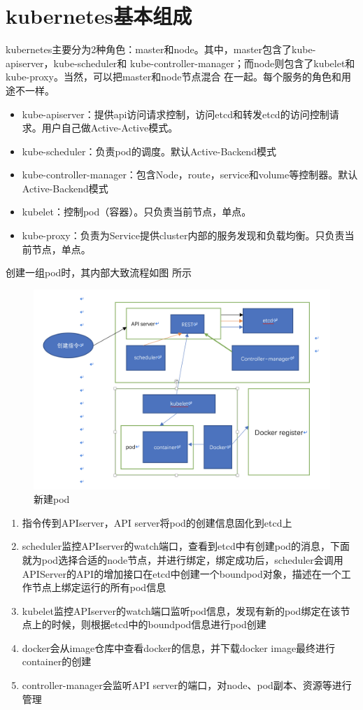 \section{kubernetes基本组成}
kubernetes主要分为2种角色：master和node。其中，master包含了kube-apiserver，kube-scheduler和
kube-controller-manager；而node则包含了kubelet和kube-proxy。当然，可以把master和node节点混合
在一起。每个服务的角色和用途不一样。
\begin{itemize}
    \item kube-apiserver：提供api访问请求控制，访问etcd和转发etcd的访问控制请求。用户自己做Active-Active模式。
    \item kube-scheduler：负责pod的调度。默认Active-Backend模式
    \item kube-controller-manager：包含Node，route，service和volume等控制器。默认Active-Backend模式
    \item kubelet：控制pod（容器）。只负责当前节点，单点。
    \item kube-proxy：负责为Service提供cluster内部的服务发现和负载均衡。只负责当前节点，单点。
\end{itemize}

创建一组pod时，其内部大致流程如图 所示
\begin{figure}[H]
  \centering
  \includegraphics[width=\linewidth]{create_pod.png}
  \caption{新建pod}
  \label{fig:create_pod}
\end{figure}

\begin{enumerate}
    \item 指令传到APIserver，API server将pod的创建信息固化到etcd上
    \item scheduler监控APIserver的watch端口，查看到etcd中有创建pod的消息，下面就为pod选择合适的node节点，并进行绑定，绑定成功后，scheduler会调用APIServer的API的增加接口在etcd中创建一个boundpod对象，描述在一个工作节点上绑定运行的所有pod信息
    \item kubelet监控APIserver的watch端口监听pod信息，发现有新的pod绑定在该节点上的时候，则根据etcd中的boundpod信息进行pod创建
    \item docker会从image仓库中查看docker的信息，并下载docker image最终进行container的创建
    \item controller-manager会监听API server的端口，对node、pod副本、资源等进行管理
\end{enumerate}

